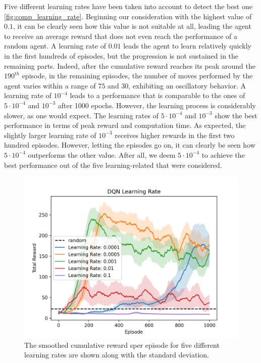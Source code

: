 \documentclass{article}
\begin{document}
Five different learning rates have been taken into account to detect the best one \autoref{fig:comp_learning_rate}. 
Beginning our consideration with the highest value of $0.1$, it can be clearly seen how this value is not suitable at all, 
leading the agent to receive an average reward that does not even reach the performance of a random agent. 
A learning rate of $0.01$ leads the agent to learn relatively quickly in the first hundreds of episodes, 
but the progression is not sustained in the remaining parts. 
Indeed, after the cumulative reward reaches its peak around the $190^{th}$ episode, in the remaining episodes, the number of moves performed by the agent varies within a range of $75$ and $30$, exhibiting an oscillatory behavior. 
A learning rate of $10^{-4}$ leads to a performance that is comparable to the ones of $5 \cdot 10^{-4}$ and $10^{-3}$ after 1000 epochs. 
However, the learning process is considerably slower, as one would expect.
The learning rates of $5 \cdot 10^{-4}$ and $10^{-3}$ show the best performance in terms of peak reward and computation time. 
As expected, the slightly larger learning rate of $10^{-3}$ 
receives higher rewards in the first two hundred episodes. 
However, letting the episodes go on, it can clearly be seen how $5 \cdot 10^{-4}$ outperforms the other value.
After all, we deem $5 \cdot 10^{-4}$ to achieve the best performance out of the five learning-related that were considered.

\begin{figure}[ht!]
   \centering
   \includegraphics[width=0.9\columnwidth]{assets/fig_hp/learning_rate.png}
   \caption{The smoothed cumulative reward sper episode for five different learning rates are shown 
   along with the standard deviation. 
   }
   \label{fig:comp_learning_rate}
\end{figure}
 
\end{document}
